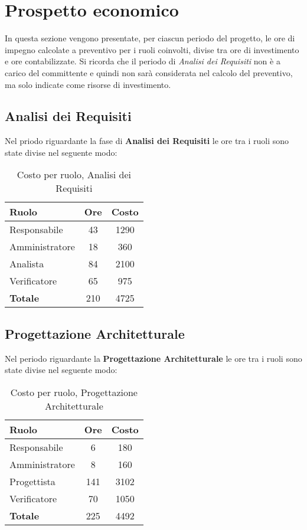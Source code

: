 \section{Prospetto economico}
In questa sezione vengono presentate, per ciascun periodo del progetto, le ore di impegno calcolate a preventivo per i ruoli coinvolti, divise tra ore di investimento e ore contabilizzate. Si ricorda che il periodo di \textit{Analisi dei Requisiti} non è a carico del committente e quindi non sarà considerata nel calcolo del preventivo, ma solo indicate come risorse di investimento.
\subsection{Analisi dei Requisiti}
Nel priodo riguardante la fase di \textbf{Analisi dei Requisiti} le ore tra i ruoli sono state divise nel seguente modo:

\begin{table}[H]
	\begin{center}
		\begin{tabular}{|l|c|c|}
			\hline
			\textbf{Ruolo}	& \textbf{Ore} & \textbf{Costo} \\
			\hline
			Responsabile	&	43	&	 1290	\\
			\hline
			Amministratore	&	18	&	 360	\\
			\hline
			Analista		&	84	&	 2100	\\
			\hline
			Verificatore	&	65	&	 975	\\
			\hline
			\textbf{Totale} &	210	&	4725	\\
			\hline
		\end{tabular}
	\end{center}
	\caption{Costo per ruolo, Analisi dei Requisiti}
\end{table}

\subsection{Progettazione Architetturale}
Nel periodo riguardante la \textbf{Progettazione Architetturale} le ore tra i ruoli sono state divise nel seguente modo:

\begin{table}[H]
	\begin{center}
		\begin{tabular}{|l|c|c|}
			\hline
			\textbf{Ruolo}	& \textbf{Ore} &	\textbf{Costo}	 \\
			\hline
			Responsabile	&	6	&	180		\\
			\hline
			Amministratore	&	8	&	160		\\
			\hline
			Progettista		&	141	&	3102	\\
			\hline
			Verificatore	&	70	&	1050	\\
			\hline
			\textbf{Totale}	&	225	&	4492	\\
			\hline
		\end{tabular}
	\end{center}
	\caption{Costo per ruolo, Progettazione Architetturale}
\end{table}

